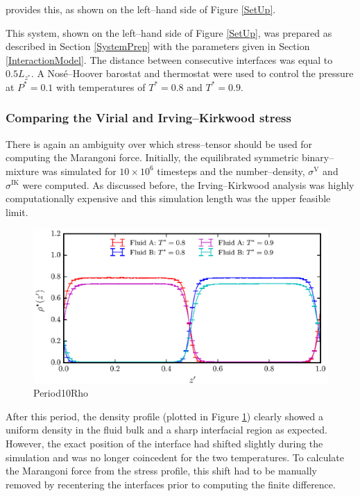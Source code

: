  provides this, as shown on the left--hand side of Figure \ref{SetUp}.

This system, shown on the left--hand side of Figure \ref{SetUp}, was prepared as described in Section \ref{SystemPrep} with the parameters given in Section \ref{InteractionModel}.
The distance between consecutive interfaces was equal to $0.5 L_{z^{*}}$.
A Nos\'{e}--Hoover barostat and thermostat were used to control the pressure at $P^{*} = 0.1$ with temperatures of $T^{*}=0.8$ and $T^{*}=0.9$.

\subsubsection{Comparing the Virial and Irving--Kirkwood stress}
There is again an ambiguity over which stress--tensor should be used for computing the Marangoni force.
Initially, the equilibrated symmetric binary--mixture was simulated for $10 \times 10^{6}$ timesteps and the number--density, $\sigma^{\mathrm{V}}$ and $\sigma^{\mathrm{IK}}$ were computed.
As discussed before, the Irving--Kirkwood analysis was highly computationally expensive and this simulation length was the upper feasible limit.
\FloatBarrier

\begin{figure}[h]
\centering
\includegraphics[scale=0.8]{Period10Rho}
\caption{Period10Rho}
\label{Period10Rho}
\end{figure}
After this period, the density profile (plotted in Figure \ref{Period10Rho}) clearly showed a uniform density in the fluid bulk and a sharp interfacial region as expected.
However, the exact position of the interface had shifted slightly during the simulation and was no longer coincedent for the two temperatures.
To calculate the Marangoni force from the stress profile, this shift had to be manually removed by recentering the interfaces prior to computing the finite difference.
\FloatBarrier

